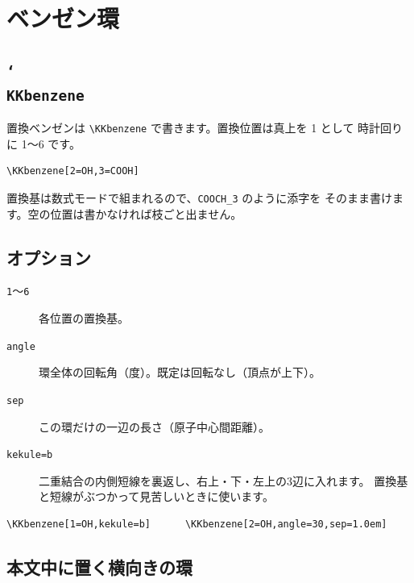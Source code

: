 \documentclass[paper=a4paper,fontsize=10pt]{jlreq}
\begin{document}
\section{ベンゼン環}

\subsection{\texttt{\char`\\KKbenzene}}

置換ベンゼンは \verb|\KKbenzene| で書きます。置換位置は真上を 1 として
時計回りに 1〜6 です。

\begin{verbatim}
\KKbenzene[2=OH,3=COOH]
\end{verbatim}

\begin{center}
\KKbenzene[2=OH,3=COOH]\qquad
\KKbenzene[1=COOH,4=COOH]\qquad
\KKbenzene[]
\end{center}

置換基は数式モードで組まれるので、\verb|COOCH_3| のように添字を
そのまま書けます。空の位置は書かなければ枝ごと出ません。

\subsection{オプション}

\begin{description}
\item[\texttt{1}〜\texttt{6}] 各位置の置換基。
\item[\texttt{angle}] 環全体の回転角（度）。既定は回転なし（頂点が上下）。
\item[\texttt{sep}] この環だけの一辺の長さ（原子中心間距離）。
\item[\texttt{kekule=b}] 二重結合の内側短線を裏返し、右上・下・左上の3辺に入れます。
      置換基と短線がぶつかって見苦しいときに使います。
\end{description}

\begin{verbatim}
\KKbenzene[1=OH,kekule=b]      \KKbenzene[2=OH,angle=30,sep=1.0em]
\end{verbatim}

\begin{center}
\KKbenzene[1=OH,kekule=b]\qquad
\KKbenzene[2=OH,angle=30,sep=1.0em]
\end{center}

\subsection{本文中に置く横向きの環}
\end{document}
